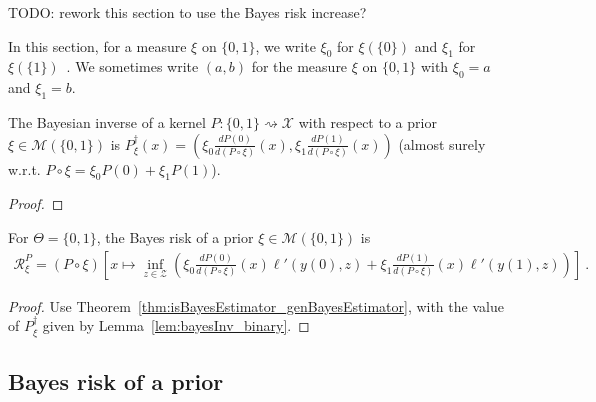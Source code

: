 TODO: rework this section to use the Bayes risk increase?

In this section, for a measure $\xi$ on $\{0,1\}$, we write $\xi_0$ for $\xi(\{0\})$ and $\xi_1$ for $\xi(\{1\})$~. We sometimes write $(a,b)$ for the measure $\xi$ on $\{0,1\}$ with $\xi_0 = a$ and $\xi_1 = b$.

\begin{lemma}
  \label{lem:bayesInv_binary}
  \leanok
  The Bayesian inverse of a kernel $P : \{0,1\} \rightsquigarrow \mathcal X$ with respect to a prior $\xi \in \mathcal M(\{0,1\})$ is $P_\xi^\dagger(x) = \left(\xi_0\frac{d P(0)}{d(P \circ \xi)}(x), \xi_1\frac{d P(1)}{d(P \circ \xi)}(x)\right)$ (almost surely w.r.t. $P \circ \xi = \xi_0 P(0) + \xi_1 P(1)$).
\end{lemma}

\begin{proof}%
{}

\end{proof}

\begin{lemma}
  \label{lem:bayesRisk_binary}
  For $\Theta = \{0,1\}$, the Bayes risk of a prior $\xi \in \mathcal M(\{0,1\})$ is
  \begin{align*}
  \mathcal R^P_\xi = (P \circ \xi)\left[x \mapsto \inf_{z \in \mathcal Z} \left( \xi_0\frac{d P(0)}{d(P \circ \xi)}(x)\ell'(y(0), z) + \xi_1\frac{d P(1)}{d(P \circ \xi)}(x)\ell'(y(1), z) \right) \right]
  \: .
  \end{align*}
\end{lemma}

\begin{proof}%
{}
Use Theorem~\ref{thm:isBayesEstimator_genBayesEstimator}, with the value of $P_\xi^\dagger$ given by Lemma~\ref{lem:bayesInv_binary}.
\end{proof}



\subsection{Bayes risk of a prior}

